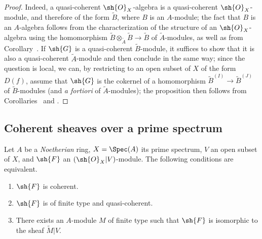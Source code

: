 \begin{proof}
Indeed, a quasi-coherent $\sh{O}_X$-algebra is a quasi-coherent $\sh{O}_X$-module, and therefore of the form $\widetilde{B}$, where $B$ is an $A$-module;
the fact that $B$ is an $A$-algebra follows from the characterization of the structure of an $\sh{O}_X$-algebra using the homomorphism $\widetilde{B}\otimes_{\widetilde{A}}\widetilde{B}\to\widetilde{B}$ of $\widetilde{A}$-modules, as well as from Corollary~.
If $\sh{G}$ is a quasi-coherent $\widetilde{B}$-module, it suffices to show that it is also a quasi-coherent $\widetilde{A}$-module and then conclude in the same way;
since the question is local, we can, by restricting to an open subset of $X$ of the form $D(f)$, assume that $\sh{G}$ is the cokernel of a homomorphism $\widetilde{B}^{(I)}\to\widetilde{B}^{(J)}$ of $\widetilde{B}$-modules (and \emph{a fortiori} of $\widetilde{A}$-modules);
the proposition then follows from Corollaries~ and .
\end{proof}

\subsection{Coherent sheaves over a prime spectrum}
\label{subsection:I.1.5}

\begin{theorem}[1.5.1]
\label{I.1.5.1}
Let $A$ be a \emph{Noetherian} ring, $X=\Spec(A)$ its prime spectrum, $V$ an open subset of $X$, and $\sh{F}$ an $(\sh{O}_X|V)$-module.
The following conditions are equivalent.
\begin{enumerate}
  \item[{\rm(a)}] $\sh{F}$ is coherent.
  \item[{\rm(b)}] $\sh{F}$ is of finite type and quasi-coherent.
  \item[{\rm(c)}] There exists an $A$-module $M$ of finite type such that $\sh{F}$ is isomorphic to the sheaf $\widetilde{M}|V$.
\end{enumerate}
\end{theorem}

